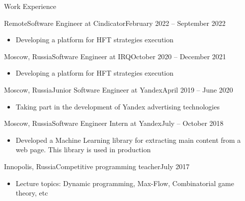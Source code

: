 \documentclass[]{cv/mcdowellcv}
\begin{document}
	\makeheader


        \begin{cvsection}{Work Experience}
            \begin{cvsubsection}{Remote}{Software Engineer at Cindicator}{February 2022 -- September 2022}
                \vskip 0.3cm
                \begin{itemize}
                    \item Developing a platform for HFT strategies execution
                \end{itemize}
            \end{cvsubsection}
            \begin{cvsubsection}{Moscow, Russia}{Software Engineer at IRQ}{October 2020 -- December 2021}
                \vskip 0.3cm
                \begin{itemize}
                    \item Developing a platform for HFT strategies execution
                \end{itemize}
            \end{cvsubsection}
            \begin{cvsubsection}{Moscow, Russia}{Junior Software Engineer at Yandex}{April 2019 -- June 2020}
                \vskip 0.3cm
                \begin{itemize}
                    \item Taking part in the development of Yandex advertising technologies
                \end{itemize}
            \end{cvsubsection}
            \begin{cvsubsection}{Moscow, Russia}{Software Engineer Intern at Yandex}{July -- October 2018}
                \vskip 0.3cm
                \begin{itemize}
                    \item Developed a Machine Learning library for extracting main content from a web page. This library is used in production
                \end{itemize}
            \end{cvsubsection}
            \begin{cvsubsection}{Innopolis, Russia}{Competitive programming teacher}{July 2017}
                \vskip 0.3cm
                \begin{itemize}
                    \item Lecture topics: Dynamic programming, Max-Flow, Combinatorial game theory, etc
                \end{itemize}
            \end{cvsubsection}
        \end{cvsection}
\end{document}
